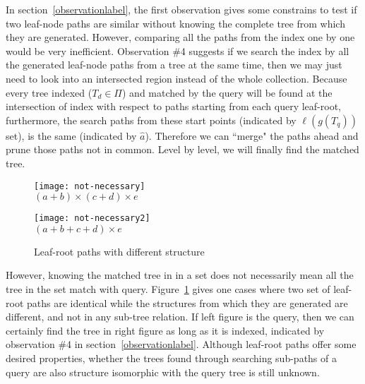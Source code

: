 In section~\ref{observationlabel}, the first observation gives some constrains to test if two leaf-node paths are similar without knowing the complete tree from which they are generated.
However, comparing all the paths from the index one by one would be very inefficient. Observation \#4 suggests if we search the index by all the generated leaf-node paths from a tree at the same time, then we may just need to look into an intersected region instead of the whole collection.
Because every tree indexed ($T_d \in \Pi$) and matched by the query will be found at the intersection of index with respect to paths starting from each query leaf-root, 
furthermore, the search paths from these start points (indicated by $\ell(g(T_q))$ set), is the same (indicated by $\hat{a}$). Therefore we can ``merge" the paths ahead and prune those paths not in common. Level by level, we will finally find the matched tree.

\begin{figure}
\begin{minipage}[b]{2.65in}
\begin{center}
\texttt{[image: not-necessary]}
\\ $(a+b) \times (c+d) \times e$
\end{center}
\end{minipage}
\hspace*{.38in}
\begin{minipage}[b]{2.65in}
\begin{center}
{\texttt{[image: not-necessary2]}}
\\ $(a+b+c+d) \times e$
\end{center}
\end{minipage}
\caption{Leaf-root paths with different structure}\label{notnecessary}
\end{figure}

However, knowing the matched tree in in a set does not necessarily mean all the tree in the set match with query. 
Figure~\ref{notnecessary} gives one cases where two set of leaf-root paths are identical while the structures from which they are generated are different, and not in any sub-tree relation. If left figure is the query, then we can certainly find the tree in right figure as long as it is indexed, indicated by observation \#4 in section~\ref{observationlabel}.
Although leaf-root paths offer some desired properties, whether the trees found through searching sub-paths of a query are also structure isomorphic with the query tree is still unknown. 

